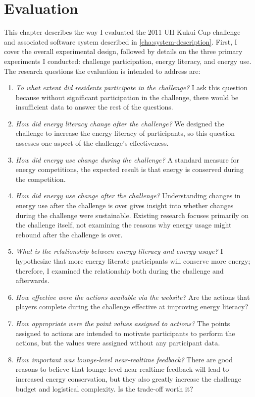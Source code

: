 \chapter{Evaluation}
\label{cha:evaluation}

This chapter describes the way I evaluated the 2011 UH Kukui Cup challenge and associated software system described in \autoref{cha:system-description}. First, I cover the overall experimental design, followed by details on the three primary experiments I conducted: challenge participation, energy literacy, and energy use. The research questions the evaluation is intended to address are:

\begin{enumerate}
	\item \emph{To what extent did residents participate in the challenge?} I ask this question because without significant participation in the challenge, there would be insufficient data to answer the rest of the questions.
	\item \emph{How did energy literacy change after the challenge?} We designed the challenge to increase the energy literacy of participants, so this question assesses one aspect of the challenge's effectiveness.
	\item \emph{How did energy use change during the challenge?} A standard measure for energy competitions, the expected result is that energy is conserved during the competition.
	\item \emph{How did energy use change after the challenge?} Understanding changes in energy use after the challenge is over gives insight into whether changes during the challenge were sustainable. Existing research focuses primarily on the challenge itself, not examining the reasons why energy usage might rebound after the challenge is over.
	\item \emph{What is the relationship between energy literacy and energy usage?} I hypothesize that more energy literate participants will conserve more energy; therefore, I examined the relationship both during the challenge and afterwards.
	\item \emph{How effective were the \emph{actions} available via the website?} Are the actions that players complete during the challenge effective at improving energy literacy?
	\item \emph{How appropriate were the point values assigned to actions?} The points assigned to actions are intended to motivate participants to perform the actions, but the values were assigned without any participant data.
	\item \emph{How important was lounge-level near-realtime feedback?} There are good reasons to believe that lounge-level near-realtime feedback will lead to increased energy conservation, but they also greatly increase the challenge budget and logistical complexity. Is the trade-off worth it?
\end{enumerate}

